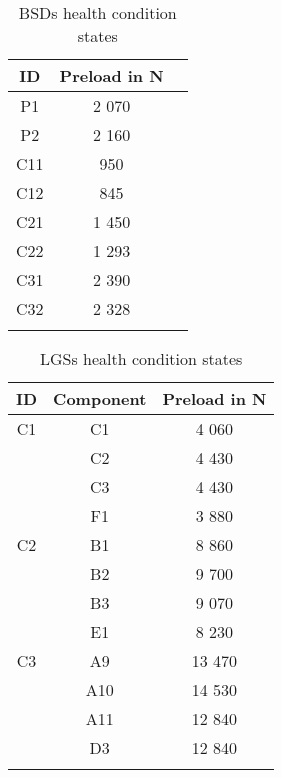 \newpage

\begin{center}
\begin{longtable}{c c c} 
\toprule
 ID & Preload in N \\ [0.5ex] 
\midrule
 P1 & 2 070 \\ 
 P2 & 2 160 \\ 
 C11 & 950 \\ 
 C12 & 845 \\ 
 C21 & 1 450 \\ [1ex] 
 C22 & 1 293 \\ [1ex] 
 C31 & 2 390 \\ [1ex] 
 C32 & 2 328 \\ [1ex] 
\bottomrule
\caption {BSDs health condition states}
\label {tab:BSDs_states}
\end{longtable}
\end{center}

\begin{center}
\begin{longtable}{c c c} 
\toprule
 ID & Component & Preload in N \\ [0.5ex] 
\midrule
 C1 & C1 & 4 060 \\ 
    & C2 & 4 430 \\ 
    & C3 & 4 430 \\
    & F1 & 3 880 \\ 
\midrule
 C2 & B1 & 8 860 \\ 
    & B2 & 9 700 \\ [1ex] 
    & B3 & 9 070 \\ [1ex]
    & E1 & 8 230 \\ [1ex]
\midrule
 C3 & A9 & 13 470 \\ 
    & A10 & 14 530 \\ [1ex] 
    & A11 & 12 840 \\ [1ex]
    & D3 & 12 840 \\ [1ex]
\bottomrule
\caption {LGSs health condition states}
\label {tab:LGSs_states}
\end{longtable}
\end{center}

\begin{comment}
\begin{center}
\begin{longtable}{c c c c c c c c c c} 
\toprule
&&&&BSD&&&&
\cmidrule(lr){3-11}
  & & C31 & C21 & C11 & P1 & C22 & C12 & C32 & P2  \\ [0.5ex] 
\cmidrule(lr){3-11}
                          & C1 & 1 & 2 & 3 & 4 & 5 & 6 & 7 & 9 \\ 
LGS                       & C2 & 10 & 11 & 12 & 13 & 14 & 15 & 16 & 18  \\ 
                          & C3 & 19 & 20 & 21 & 22 & 23 & 24 & 25 & 27  \\
\bottomrule
\caption {Combinations of LGS and BSD health condition states}
\label {tab:recorded_combinations_of_LGS_and_BSD_health_conditions}
\end{longtable}
\end{center}
\end{comment}






